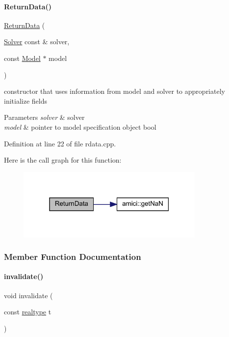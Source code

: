 \paragraph{\texorpdfstring{Return\+Data()}{ReturnData()}}
{\footnotesize\ttfamily \mbox{\hyperlink{classamici_1_1_return_data}{Return\+Data}} (\begin{DoxyParamCaption}\item[{\mbox{\hyperlink{classamici_1_1_solver}{Solver}} const \&}]{solver,  }\item[{const \mbox{\hyperlink{classamici_1_1_model}{Model}} $\ast$}]{model }\end{DoxyParamCaption})}

constructor that uses information from model and solver to appropriately initialize fields 
\begin{DoxyParams}{Parameters}
{\em solver} & solver \\
\hline
{\em model} & pointer to model specification object bool\\
\hline
\end{DoxyParams}


Definition at line 22 of file rdata.\+cpp.

Here is the call graph for this function\+:
\nopagebreak
\begin{figure}[H]
\begin{center}
\leavevmode
\includegraphics[width=262pt]{classamici_1_1_return_data_a9fa947e466f4c7f55d36d1e81722abdc_cgraph}
\end{center}
\end{figure}


\subsubsection{Member Function Documentation}
\mbox{\label{classamici_1_1_return_data_ab320e46748c17908f0bd4bba240b8e92}} 
\paragraph{\texorpdfstring{invalidate()}{invalidate()}}
{\footnotesize\ttfamily void invalidate (\begin{DoxyParamCaption}\item[{const \mbox{\hyperlink{namespaceamici_a1bdce28051d6a53868f7ccbf5f2c14a3}{realtype}}}]{t }\end{DoxyParamCaption})}

